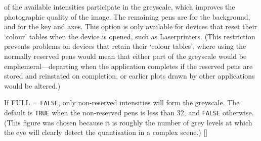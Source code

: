 {{{{         of the available intensities participate in the greyscale,
         which improves the photographic quality of the image.  The
         remaining pens are for the background, and for the key and
         axes.  This option is only available for devices that reset
         their `colour' tables when the device is opened, such as
         Laserprinters. (This restriction prevents problems on devices
         that retain their `colour tables', where using the normally
         reserved pens would mean that either part of the greyscale
         would be emphemeral---departing when the application
         completes if the reserved pens are stored and reinstated on
         completion, or earlier plots drawn by other applications would
         be altered.)

         If FULL = {\tt FALSE}, only non-reserved intensities will form the
         greyscale.  The default is {\tt TRUE} when the non-reserved pens
         is less than 32, and {\tt FALSE} otherwise.  (This figure was chosen
         because it is roughly the number of grey levels at which the
         eye will clearly detect the quantisation in a complex scene.)
         []
      }
      }}}

